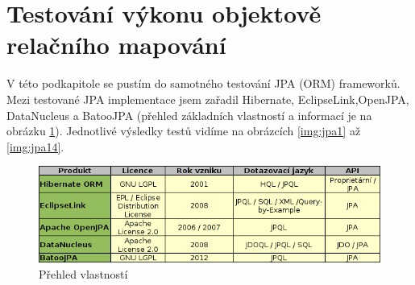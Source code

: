 \section{Testování výkonu objektově relačního mapování }
V této podkapitole se pustím do samotného testování JPA (ORM) frameworků. Mezi testované JPA implementace jsem zařadil Hibernate, EclipseLink,OpenJPA, DataNucleus a BatooJPA (přehled základních vlastností a informací je na obrázku \ref{img:jpa:comp}). Jednotlivé výsledky testů vidíme na obrázcích \ref{img:jpa1} až \ref{img:jpa14}.
\begin{figure}[!h]
  \includegraphics[width=38em]{obr/jpa_comp}
  \caption{Přehled vlastností}\label{img:jpa:comp}
\end{figure}
